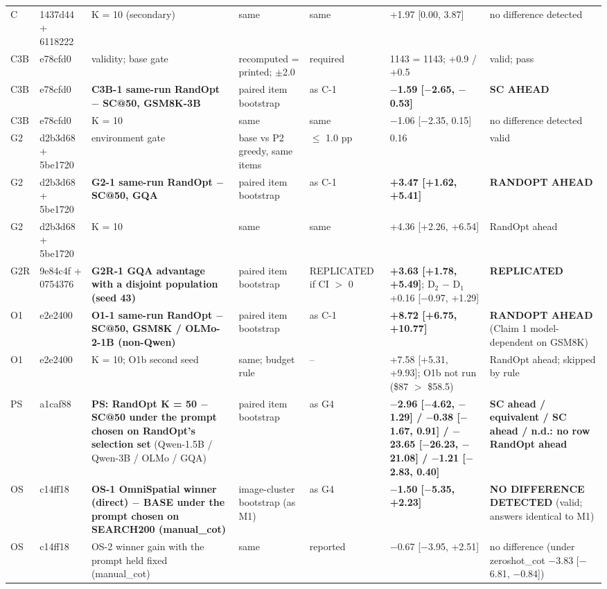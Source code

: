 \begin{longtable}{p{1.2cm}p{1.3cm}p{3.8cm}p{2.1cm}p{2.1cm}p{2.4cm}p{2.7cm}}
C & 1437d44 + 6118222 & K = 10 (secondary) & same & same & +1.97 [0.00, 3.87] & no difference detected \\
C3B & e78cfd0 & validity; base gate & recomputed = printed; $\pm$2.0 & required & 1143 = 1143; +0.9 / +0.5 & valid; pass \\
C3B & e78cfd0 & \textbf{C3B-1 same-run RandOpt $-$ SC@50, GSM8K-3B} & paired item bootstrap & as C-1 & \textbf{$-$1.59 [$-$2.65, $-$0.53]} & \textbf{SC AHEAD} \\
C3B & e78cfd0 & K = 10 & same & same & $-$1.06 [$-$2.35, 0.15] & no difference detected \\
G2 & d2b3d68 + 5be1720 & environment gate & base vs P2 greedy, same items & $\le$ 1.0 pp & 0.16 & valid \\
G2 & d2b3d68 + 5be1720 & \textbf{G2-1 same-run RandOpt $-$ SC@50, GQA} & paired item bootstrap & as C-1 & \textbf{+3.47 [+1.62, +5.41]} & \textbf{RANDOPT AHEAD} \\
G2 & d2b3d68 + 5be1720 & K = 10 & same & same & +4.36 [+2.26, +6.54] & RandOpt ahead \\
G2R & 9e84c4f + 0754376 & \textbf{G2R-1 GQA advantage with a disjoint population (seed 43)} & paired item bootstrap & REPLICATED if CI $>$ 0 & \textbf{+3.63 [+1.78, +5.49]}; D$_2$ $-$ D$_1$ +0.16 [$-$0.97, +1.29] & \textbf{REPLICATED} \\
O1 & e2e2400 & \textbf{O1-1 same-run RandOpt $-$ SC@50, GSM8K / OLMo-2-1B (non-Qwen)} & paired item bootstrap & as C-1 & \textbf{+8.72 [+6.75, +10.77]} & \textbf{RANDOPT AHEAD} (Claim 1 model-dependent on GSM8K) \\
O1 & e2e2400 & K = 10; O1b second seed & same; budget rule & -- & +7.58 [+5.31, +9.93]; O1b not run (\$87 $>$ \$58.5) & RandOpt ahead; skipped by rule \\
PS & a1caf88 & \textbf{PS: RandOpt K = 50 $-$ SC@50 under the prompt chosen on RandOpt's selection set} (Qwen-1.5B / Qwen-3B / OLMo / GQA) & paired item bootstrap & as G4 & \textbf{$-$2.96 [$-$4.62, $-$1.29] / $-$0.38 [$-$1.67, 0.91] / $-$23.65 [$-$26.23, $-$21.08] / $-$1.21 [$-$2.83, 0.40]} & \textbf{SC ahead / equivalent / SC ahead / n.d.: no row RandOpt ahead} \\
OS & c14ff18 & \textbf{OS-1 OmniSpatial winner (direct) $-$ BASE under the prompt chosen on SEARCH200 (manual\_cot)} & image-cluster bootstrap (as M1) & as G4 & \textbf{$-$1.50 [$-$5.35, +2.23]} & \textbf{NO DIFFERENCE DETECTED} (valid; answers identical to M1) \\
OS & c14ff18 & OS-2 winner gain with the prompt held fixed (manual\_cot) & same & reported & $-$0.67 [$-$3.95, +2.51] & no difference (under zeroshot\_cot $-$3.83 [$-$6.81, $-$0.84]) \\

\end{longtable}
